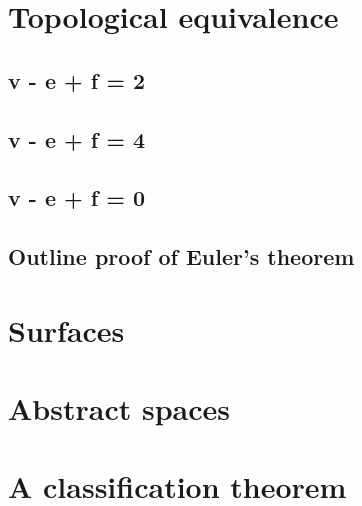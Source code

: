\documentclass{beamer}
\begin{document}
\section{Topological equivalence}
    \subsection{v - e + f = 2}
    \subsection{v - e + f = 4}
    \subsection{v - e + f = 0}
    \subsection{Outline proof of Euler's theorem}
\section{Surfaces}
\section{Abstract spaces}
\section{A classification theorem}
\end{document}
